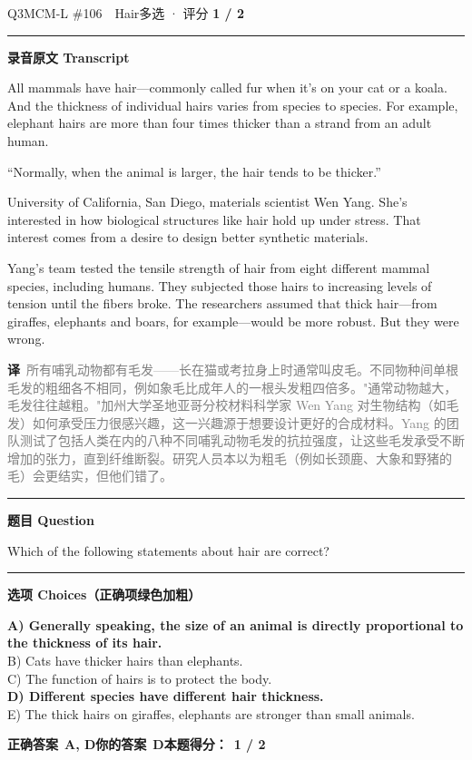 \documentclass[11pt]{article}
\newcommand{\ptesub}[1]{%
  \par\needspace{2\baselineskip}\smallskip
  {\color{cAccent}\rule[-0.2ex]{3pt}{1.05em}}\hspace{6pt}%
  {\bfseries\color{cHead}#1}\par\nopagebreak\smallskip}
\newcommand{\zh}[1]{{\footnotesize\textcolor{cNote}{\textbf{译}}\ \textcolor{gray}{#1}}}
\begin{document}
\begin{qblock}{Q3\quad MCM-L \#106\ \ Hair}{多选 · 评分 \textcolor{cAccent}{\bfseries 1 / 2}}
\ptesub{录音原文 Transcript}
\begin{promptbox}
All mammals have hair---commonly called fur when it's on your cat or a koala. And the thickness of individual hairs varies from species to species. For example, elephant hairs are more than four times thicker than a strand from an adult human.

``Normally, when the animal is larger, the hair tends to be thicker.''

University of California, San Diego, materials scientist Wen Yang. She's interested in how biological structures like hair hold up under stress. That interest comes from a desire to design better synthetic materials.

Yang's team tested the tensile strength of hair from eight different mammal species, including humans. They subjected those hairs to increasing levels of tension until the fibers broke. The researchers assumed that thick hair---from giraffes, elephants and boars, for example---would be more robust. But they were wrong.
\end{promptbox}
\zh{所有哺乳动物都有毛发——长在猫或考拉身上时通常叫皮毛。不同物种间单根毛发的粗细各不相同，例如象毛比成年人的一根头发粗四倍多。"通常动物越大，毛发往往越粗。"加州大学圣地亚哥分校材料科学家 Wen Yang 对生物结构（如毛发）如何承受压力很感兴趣，这一兴趣源于想要设计更好的合成材料。Yang 的团队测试了包括人类在内的八种不同哺乳动物毛发的抗拉强度，让这些毛发承受不断增加的张力，直到纤维断裂。研究人员本以为粗毛（例如长颈鹿、大象和野猪的毛）会更结实，但他们错了。}
\ptesub{题目 Question}
\begin{notebox}Which of the following statements about hair are correct?\end{notebox}
\ptesub{选项 Choices（正确项绿色加粗）}
{\small
{\color{cFix}\textbf{A) Generally speaking, the size of an animal is directly proportional to the thickness of its hair.}}\\
B) Cats have thicker hairs than elephants.\\
C) The function of hairs is to protect the body.\\
{\color{cFix}\textbf{D) Different species have different hair thickness.}}\\
E) The thick hairs on giraffes, elephants are stronger than small animals.}
\par\smallskip
\textbf{正确答案}\ \textcolor{cFix}{\bfseries A, D}\qquad\textbf{你的答案}\ \textcolor{cFix}{\bfseries D}\qquad\textbf{本题得分：}\ {\color{cAccent}\bfseries 1 / 2}
\end{qblock}
\end{document}
